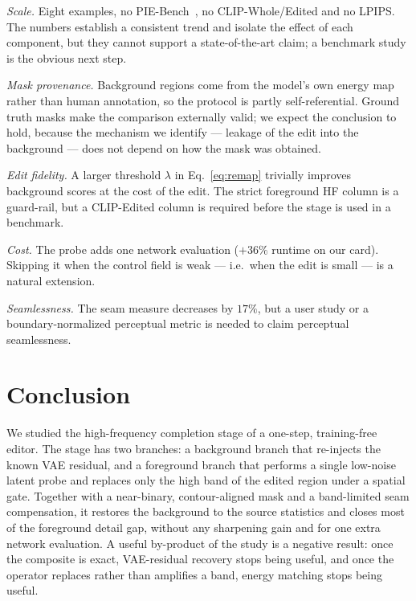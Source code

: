 \documentclass[10pt,twocolumn,letterpaper]{article}
\begin{document}
\emph{Scale.} Eight examples, no PIE-Bench~\cite{pnpinversion}, no
CLIP-Whole/Edited and no LPIPS. The numbers establish a consistent trend and
isolate the effect of each component, but they cannot support a
state-of-the-art claim; a benchmark study is the obvious next step.

\emph{Mask provenance.} Background regions come from the model's own energy map
rather than human annotation, so the protocol is partly self-referential. Ground
truth masks make the comparison externally valid; we expect the conclusion to
hold, because the mechanism we identify --- leakage of the edit into the
background --- does not depend on how the mask was obtained.

\emph{Edit fidelity.} A larger threshold $\lambda$ in Eq.~\eqref{eq:remap}
trivially improves background scores at the cost of the edit. The strict
foreground HF column is a guard-rail, but a CLIP-Edited column is required before
the stage is used in a benchmark.

\emph{Cost.} The probe adds one network evaluation ($+36\%$ runtime on our card).
Skipping it when the control field is weak --- i.e.\ when the edit is small --- is
a natural extension.

\emph{Seamlessness.} The seam measure decreases by $17\%$, but a user study or a
boundary-normalized perceptual metric is needed to claim perceptual
seamlessness.

\section{Conclusion}
We studied the high-frequency completion stage of a one-step, training-free
editor. The stage has two branches: a background branch that re-injects the known
VAE residual, and a foreground branch that performs a single low-noise latent
probe and replaces only the high band of the edited region under a spatial gate.
Together with a near-binary, contour-aligned mask and a band-limited seam
compensation, it restores the background to the source statistics and closes most
of the foreground detail gap, without any sharpening gain and for one extra
network evaluation. A useful by-product of the study is a negative result: once
the composite is exact, VAE-residual recovery stops being useful, and once the
operator replaces rather than amplifies a band, energy matching stops being
useful.

{\small


}
\end{document}
